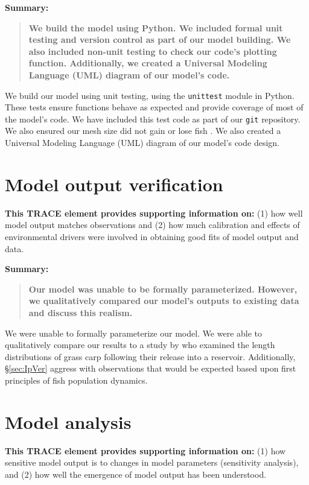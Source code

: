 \documentclass{article}[12pt]
\begin{document}
\textbf{Summary:}
\begin{verse}
\textbf{ 
We build the model using Python.
We included formal unit testing and version control as part of our model building.
We also included non-unit testing to check our code's plotting function.
Additionally, we created a Universal Modeling Language (UML) diagram of our model's code.}
\end{verse}

We build our model using unit testing, using the \texttt{unittest} module in Python.
These tests ensure functions behave as expected and provide coverage of most of the model's code.
We have included this test code as part of our \texttt{git} repository.  
We also ensured our mesh size did not gain or lose fish \citep{williams2012avoiding}.  
We also created a Universal Modeling Language (UML) diagram of our model's code design. 

\section{Model output verification}

\textbf{This TRACE element provides supporting information on:} (1) how well model output matches observations and (2) how much calibration and effects of environmental drivers were involved in obtaining good fits of model output and data. 

\textbf{Summary:}
\begin{verse}
\textbf{
Our model was unable to be formally parameterized. 
However, we qualitatively compared our model's outputs to existing data and discuss this realism. 
}
\end{verse}

We were unable to formally parameterize our model. 
We were able to qualitatively compare our results to a study by \citet{martyn1986mapping} who examined the length distributions of grass carp following their release into a reservoir.
Additionally, \S \ref{sec:IpVer} aggress with observations that would be expected based upon first principles of fish population dynamics. 

\section{Model analysis}

\textbf{This TRACE element provides supporting information on:} (1) how sensitive model output is to changes in model parameters (sensitivity analysis), and (2) how well the emergence of model output has been understood. 
\end{document}
